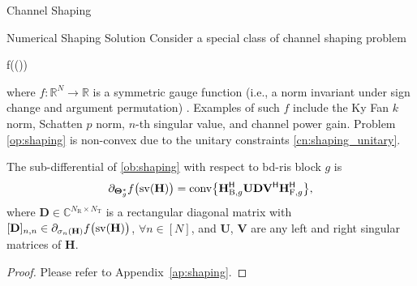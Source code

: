 \documentclass[journal]{IEEEtran}
\begin{document}
\begin{section}{Channel Shaping}
	\begin{subsection}{Numerical Shaping Solution}
		\label{sc:shaping_numerical}
		Consider a special class of channel shaping problem
		\begin{maxi!}
			{\scriptstyle{\mathbf{\Theta}}}{f\bigl(\sv()\bigr)}{\label{op:shaping}}{\label{ob:shaping}}
		\end{maxi!}
		where $f: \mathbb{R}^{N} \to \mathbb{R}$ is a symmetric gauge function (i.e., a norm invariant under sign change and argument permutation) \cite{Watson1992}.
		Examples of such $f$ include the Ky Fan $k$ norm, Schatten $p$ norm, $n$-th singular value, and channel power gain.
		Problem \eqref{op:shaping} is non-convex due to the unitary constraints \eqref{cn:shaping_unitary}.
		\begin{proposition}
			\label{pp:shaping}
			The sub-differential of \eqref{ob:shaping} with respect to \gls{bd}-\gls{ris} block $g$ is
			\begin{equation}
				\label{eq:shaping_subdiff}
				\partial_{\mathbf{\Theta}_g^*} f\bigl(\operatorname{sv}(\mathbf{H})\bigr) = \operatorname{conv} \bigl\{ \mathbf{H}_{\mathrm{B},g}^\mathsf{H} \mathbf{U} \mathbf{D} \mathbf{V}^\mathsf{H} \mathbf{H}_{\mathrm{F},g}^\mathsf{H} \bigr\},
			\end{equation}
			where $\mathbf{D} \in \mathbb{C}^{N_\mathrm{R} \times N_\mathrm{T}}$ is a rectangular diagonal matrix with $[\mathbf{D}]_{n,n} \in \partial_{\sigma_n(\mathbf{H})} f\bigl(\operatorname{sv}(\mathbf{H})\bigr)$, $\forall n \in [N]$, and $\mathbf{U}$, $\mathbf{V}$ are any left and right singular matrices of $\mathbf{H}$.
		\end{proposition}

		\begin{proof}
			Please refer to Appendix~\ref{ap:shaping}.
		\end{proof}


\end{subsection}
\end{section}
\end{document}
